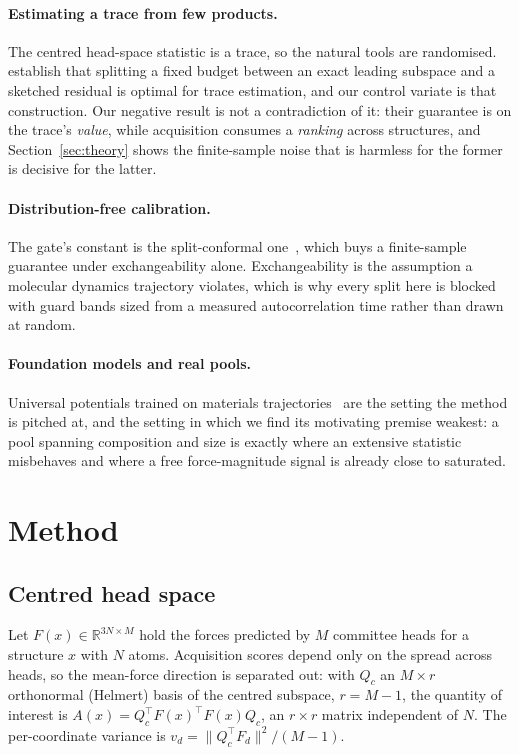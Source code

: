 \paragraph{Estimating a trace from few products.}
The centred head-space statistic is a trace, so the natural tools are randomised.
\citet{meyer2021hutchpp} establish that splitting a fixed budget between an exact
leading subspace and a sketched residual is optimal for trace estimation, and our
control variate is that construction. Our negative result is not a contradiction
of it: their guarantee is on the trace's \emph{value}, while acquisition consumes
a \emph{ranking} across structures, and Section~\ref{sec:theory} shows the
finite-sample noise that is harmless for the former is decisive for the latter.

\paragraph{Distribution-free calibration.}
The gate's constant is the split-conformal
one~\citep{vovk2005algorithmic,lei2018distribution}, which buys a finite-sample
guarantee under exchangeability alone. Exchangeability is the assumption a
molecular dynamics trajectory violates, which is why every split here is blocked
with guard bands sized from a measured autocorrelation time rather than drawn at
random.

\paragraph{Foundation models and real pools.}
Universal potentials trained on materials
trajectories~\citep{deng2023chgnet,batatia2023foundation} are the setting the
method is pitched at, and the setting in which we find its motivating premise
weakest: a pool spanning composition and size is exactly where an extensive
statistic misbehaves and where a free force-magnitude signal is already close to
saturated.

\section{Method}

\subsection{Centred head space}
Let $F(x)\in\mathbb{R}^{3N\times M}$ hold the forces predicted by $M$ committee
heads for a structure $x$ with $N$ atoms. Acquisition scores depend only on the
spread across heads, so the mean-force direction is separated out: with $Q_c$ an
$M\times r$ orthonormal (Helmert) basis of the centred subspace, $r=M-1$, the
quantity of interest is $A(x)=Q_c^{\top}F(x)^{\top}F(x)Q_c$, an $r\times r$
matrix independent of $N$. The per-coordinate variance is
$v_d=\lVert Q_c^{\top}F_d\rVert^2/(M-1)$.

